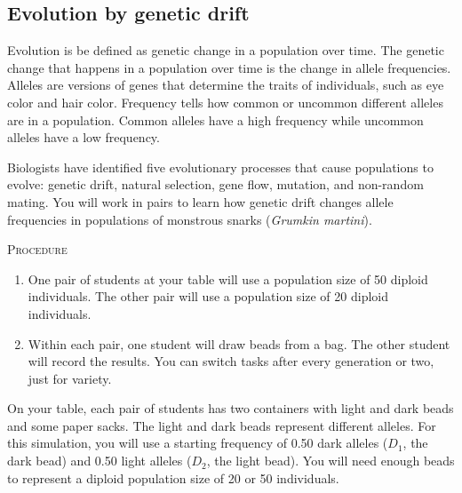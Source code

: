 \documentclass[12pt][hidelinks]{exam}
\begin{document}
\subsection*{Evolution by genetic drift}

Evolution is be defined as genetic change in a population over time. 
The genetic change that happens in a population over time is the change 
in allele frequencies. Alleles are versions of genes that determine the 
traits of individuals, such as eye color and hair color. Frequency tells 
how common or uncommon different alleles are in a population. Common 
alleles have a high frequency while uncommon alleles have a low frequency.  

Biologists have identified five evolutionary processes that cause 
populations to evolve: genetic drift, natural selection, gene flow, 
mutation, and non-random mating. You will work in pairs to learn how 
genetic drift changes allele frequencies in populations of monstrous snarks
(\textit{Grumkin martini}). 

\bigskip

\textsc{Procedure}

\medskip

\begin{enumerate}
	\item One pair of students at your table will use a population size of 
	50 diploid individuals. The other pair will use a population size of 20
	diploid individuals. 
	
	\item Within each pair, one student will draw beads from a bag. The other
	student will record the results. You can switch tasks after every 
	generation or two, just for variety.
	
\end{enumerate}

On your table, each pair of students has two containers with light and dark beads and some 
paper sacks. The light and dark beads represent different alleles. For this 
simulation, you will use a starting frequency of 0.50 dark alleles ($D_1$, the dark 
bead) and 0.50 light alleles ($D_2$, the light bead). You will need enough beads 
to represent a diploid population size of 20 or 50 individuals.
\end{document}
